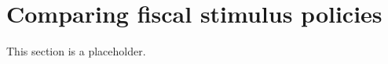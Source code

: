 \documentclass[\latexroot/\projectname]{subfiles}
\begin{document}
\FloatBarrier
\section{Comparing fiscal stimulus policies}
\whenintegrated{\label{sec:comparing}} %
\whenintegrated{\label{sec:welfare}}

This section is a placeholder.

\smartbib
\end{document}
